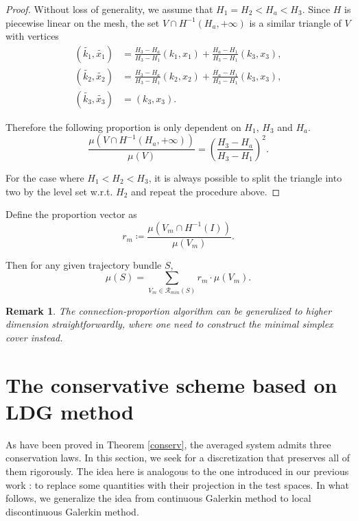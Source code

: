 \documentclass{article}
\newtheorem{remark}{Remark}
\numberwithin{equation}{section}
\begin{document}
\begin{proof}
    Without loss of generality, we assume that $H_{1} = H_{2} < H_{a} < H_{3}$. Since $H$ is piecewise linear on the mesh, the set $V\cap H^{-1}(H_{a}, +\infty)$ is a similar triangle of $V$ with vertices 
    \begin{equation*}
        \begin{split}
            \left(\tilde{k_{1}},\tilde{x_{1}}\right)
            &=\frac{H_{3}-H_{a}}{H_{3}-H_{1}}\left(k_{1},x_{1}\right)+\frac{H_{a}-H_{1}}{H_{3}-H_{1}}\left(k_{3},x_{3}\right),\\
            \left(\tilde{k_{2}},\tilde{x_{2}}\right)
            &=\frac{H_{3}-H_{a}}{H_{3}-H_{1}}\left(k_{2},x_{2}\right)+\frac{H_{a}-H_{1}}{H_{3}-H_{1}}\left(k_{3},x_{3}\right),\\
            \left(\tilde{k_{3}},\tilde{x_{3}}\right)
            &=\left(k_{3},x_{3}\right).
        \end{split}
    \end{equation*}

    Therefore the following proportion is only dependent on $H_{1}$, $H_{3}$ and $H_{a}$.
    \begin{equation*}
        \frac{\mu(V\cap H^{-1}(H_{a},+\infty))}{\mu(V)}=\left(\frac{H_{3}-H_{a}}{H_{3}-H_{1}}\right)^{2}.
    \end{equation*}

    For the case where $H_{1} < H_{2} < H_{3}$, it is always possible to split the triangle into two by the level set w.r.t. $H_{2}$ and repeat the procedure above.
\end{proof}

Define the proportion vector as
\begin{equation*}
    r_{m}\coloneqq\frac{\mu(V_{m}\cap H^{-1}(I))}{\mu(V_{m})}.
\end{equation*}


Then for any given trajectory bundle $S$,  
\begin{equation*}
    \mu(S)=\sum_{V_{m}\in\mathcal{R}_{min}(S)}r_{m}\cdot\mu(V_{m}).
\end{equation*}

\begin{remark}
    The connection-proportion algorithm can be generalized to higher dimension straightforwardly, where one need to construct the minimal simplex cover instead.
\end{remark}

\section{The conservative scheme based on LDG method} \label{sec:ldg}
As have been proved in Theorem \ref{conserv}, the averaged system admits three conservation laws. In this section, we seek for a discretization that preserves all of them rigorously. The idea here is analogous to the one introduced in our previous work \cite{huang2023conservative}: to replace some quantities with their projection in the test spaces. In what follows, we generalize the idea from continuous Galerkin method to local discontinuous Galerkin method.
\end{document}

